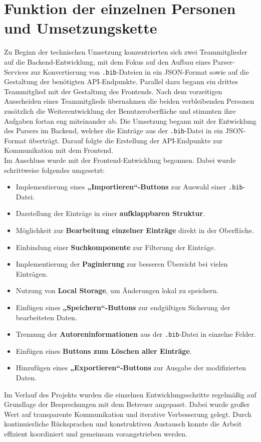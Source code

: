 \section{Funktion der einzelnen Personen und Umsetzungskette}
Zu Beginn der technischen Umsetzung konzentrierten sich zwei Teammitglieder auf die Backend-Entwicklung,
mit dem Fokus auf den Aufbau eines Parser-Services zur Konvertierung von \texttt{.bib}-Dateien in
ein JSON-Format sowie auf die Gestaltung der benötigten API-Endpunkte.
Parallel dazu begann ein drittes Teammitglied mit der Gestaltung des Frontends.
Nach dem vorzeitigen Ausscheiden eines Teammitglieds übernahmen die
beiden verbleibenden Personen zusätzlich die Weiterentwicklung der Benutzeroberfläche und
stimmten ihre Aufgaben fortan eng miteinander ab.
Die Umsetzung begann mit der Entwicklung des Parsers im Backend,
welcher die Einträge aus der \texttt{.bib}-Datei in ein JSON-Format überträgt.
Darauf folgte die Erstellung der API-Endpunkte zur Kommunikation mit dem Frontend.\\

\noindent Im Anschluss wurde mit der Frontend-Entwicklung begonnen. Dabei wurde schrittweise folgendes umgesetzt:

\begin{itemize}
    \item Implementierung eines \textbf{„Importieren“-Buttons} zur Auswahl einer \texttt{.bib}-Datei.
    \item Darstellung der Einträge in einer \textbf{aufklappbaren Struktur}.
    \item Möglichkeit zur \textbf{Bearbeitung einzelner Einträge} direkt in der Oberfläche.
    \item Einbindung einer \textbf{Suchkomponente} zur Filterung der Einträge.
    \item Implementierung der \textbf{Paginierung} zur besseren Übersicht bei vielen Einträgen.
    \item Nutzung von \textbf{Local Storage}, um Änderungen lokal zu speichern.
    \item Einfügen eines \textbf{„Speichern“-Buttons} zur endgültigen Sicherung der bearbeiteten Daten.
    \item Trennung der \textbf{Autoreninformationen} aus der \texttt{.bib}-Datei in einzelne Felder.
    \item Einfügen eines \textbf{Buttons zum Löschen aller Einträge}.
    \item Hinzufügen eines \textbf{„Exportieren“-Buttons} zur Ausgabe der modifizierten Daten.
\end{itemize}

\noindent Im Verlauf des Projekts wurden die einzelnen Entwicklungsschritte regelmäßig
auf Grundlage der Besprechungen mit dem Betreuer angepasst. Dabei wurde großer Wert auf transparente
Kommunikation und iterative Verbesserung gelegt. Durch kontinuierliche Rücksprachen und konstruktiven Austausch 
konnte die Arbeit effizient koordiniert und gemeinsam vorangetrieben werden.